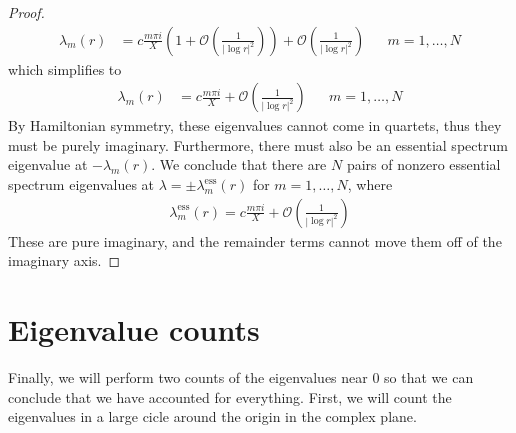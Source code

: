 \documentclass[thesis.tex]{subfiles}
\begin{document}
\begin{lemma}
\begin{proof}
\begin{align*}
\lambda_m(r) &= c \frac{m \pi i }{X} \left( 1 + \mathcal{O}\left( \frac{1}{|\log r|^2} \right)\right) + \mathcal{O}\left( \frac{1}{|\log r|^2} \right) && m = 1, \dots, N
\end{align*}
which simplifies to 
\begin{align*}
\lambda_m(r) &= c \frac{m \pi i }{X} + \mathcal{O}\left( \frac{1}{|\log r|^2} \right) && m = 1, \dots, N
\end{align*}
By Hamiltonian symmetry, these eigenvalues cannot come in quartets, thus they must be purely imaginary. Furthermore, there must also be an essential spectrum eigenvalue at $-\lambda_m(r)$. We conclude that there are $N$ pairs of nonzero essential spectrum eigenvalues at $\lambda = \pm \lambda_m^{\text{ess}}(r)$ for $m = 1, \dots, N$, where
\begin{align}
\lambda^{\text{ess}}_m(r) = c \frac{m \pi i }{X} + \mathcal{O}\left( \frac{1}{|\log r|^2} \right)
\end{align}
These are pure imaginary, and the remainder terms cannot move them off of the imaginary axis.
\end{proof}
\end{lemma}

\section{Eigenvalue counts}

Finally, we will perform two counts of the eigenvalues near 0 so that we can conclude that we have accounted for everything. First, we will count the eigenvalues in a large cicle around the origin in the complex plane.
\end{document}
